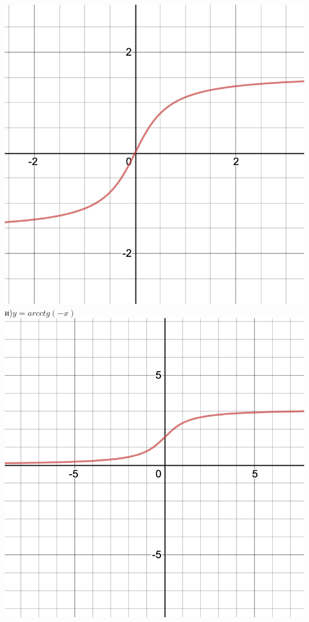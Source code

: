 \documentclass[a4paper]{article}
\begin{document}
    \includegraphics[scale=0.1]{h}\\
    и)$y=arcctg(-x)$
    \includegraphics[scale=0.1]{i}\\\\
\end{document}
